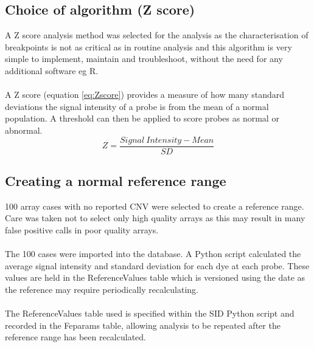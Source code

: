 \subsection{Choice of algorithm (Z score)}
A Z score analysis method was selected for the analysis as the characterisation of breakpoints is not as critical as in routine analysis and this algorithm is very simple to implement, maintain and troubleshoot, without the need for any additional software eg R.
\paragraph*{}
A Z score (equation \ref{eq:Zscore}) provides a measure of how many standard deviations the signal intensity of a probe is from the mean of a normal population. A threshold can then be applied to score probes as normal or abnormal.
\begin{equation} \label{eq:Zscore}
Z = \frac{Signal\ Intensity - Mean}{SD}
\end{equation}

\subsection{Creating a normal reference range} \label{ch:createreference}
100 array cases with no reported CNV were selected to create a reference range. Care was taken not to select only high quality arrays as this may result in many false positive calls in poor quality arrays.
\paragraph*{}
The 100 cases were imported into the database. A Python script calculated the average signal intensity and standard deviation for each dye at each probe.
These values are held in the ReferenceValues table which is versioned using the date as the reference may require periodically recalculating.
\paragraph*{}
The ReferenceValues table used is specified within the SID  Python script and recorded in the Feparams table, allowing analysis to be repeated after the reference range has been recalculated.
